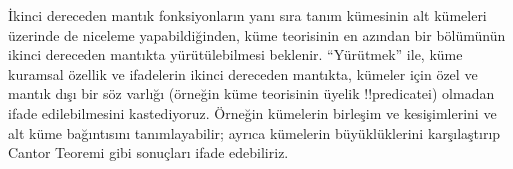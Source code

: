 



İkinci dereceden mantık fonksiyonların yanı sıra tanım kümesinin alt kümeleri
üzerinde de niceleme yapabildiğinden, küme teorisinin en azından bir
bölümünün ikinci dereceden mantıkta yürütülebilmesi beklenir. ``Yürütmek''
ile, küme kuramsal özellik ve ifadelerin ikinci dereceden mantıkta, kümeler
için özel ve mantık dışı bir söz varlığı (örneğin küme teorisinin üyelik
!!{predicate}{}i) olmadan ifade edilebilmesini kastediyoruz. Örneğin kümelerin
birleşim ve kesişimlerini ve alt küme bağıntısını tanımlayabilir; ayrıca
kümelerin büyüklüklerini karşılaştırıp Cantor Teoremi gibi sonuçları ifade
edebiliriz.

